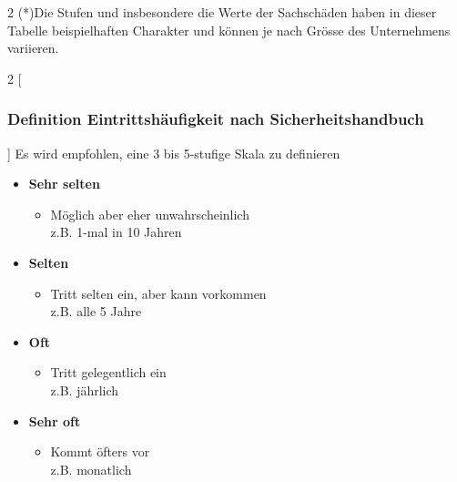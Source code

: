 \documentclass[10pt,a4paper]{article}
\begin{document}
\begin{multicols}{2}
(*)Die Stufen und insbesondere die Werte der Sachschäden haben in dieser Tabelle beispielhaften Charakter und können je nach Grösse des Unternehmens variieren.
\end{multicols}

\begin{multicols}{2}
[\subsubsection*{Definition Eintrittshäufigkeit nach Sicherheitshandbuch}]
Es wird empfohlen, eine 3 bis 5-stufige Skala zu definieren

\begin{itemize}[noitemsep,topsep=0pt,leftmargin=*]
    \item \textbf{Sehr selten}
    \begin{itemize}[noitemsep,topsep=0pt,leftmargin=*]
        \item Möglich aber eher unwahrscheinlich \\z.B. 1-mal in 10 Jahren
    \end{itemize}
    \item \textbf{Selten}
    \begin{itemize}[noitemsep,topsep=0pt,leftmargin=*]
        \item Tritt selten ein, aber kann vorkommen\\z.B. alle 5 Jahre
    \end{itemize}
    \item \textbf{Oft}
    \begin{itemize}[noitemsep,topsep=0pt,leftmargin=*]
        \item Tritt gelegentlich ein\\z.B. jährlich
    \end{itemize}
    \item \textbf{Sehr oft}
    \begin{itemize}[noitemsep,topsep=0pt,leftmargin=*]
        \item Kommt öfters vor\\z.B. monatlich
    \end{itemize}
\end{itemize}
\end{multicols}
\end{document}
